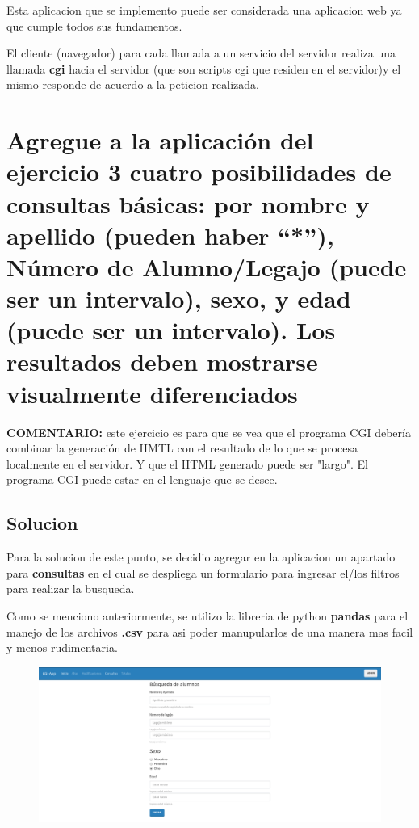 \documentclass[12pt]{extarticle}
\begin{document}
Esta aplicacion que se implemento puede ser considerada una aplicacion
web ya que cumple todos sus fundamentos.

El cliente (navegador) para cada llamada a un servicio del servidor
realiza una llamada \textbf{cgi} hacia el servidor (que son scripts cgi
que residen en el servidor)y el mismo responde de acuerdo a la peticion
realizada.

    \section{Agregue a la aplicación del ejercicio 3 cuatro posibilidades de
consultas básicas: por nombre y apellido (pueden haber ``*''), Número de
Alumno/Legajo (puede ser un intervalo), sexo, y edad (puede ser un
intervalo). Los resultados deben mostrarse visualmente
diferenciados}\label{agregue-a-la-aplicaciuxf3n-del-ejercicio-3-cuatro-posibilidades-de-consultas-buxe1sicas-por-nombre-y-apellido-pueden-haber-nuxfamero-de-alumnolegajo-puede-ser-un-intervalo-sexo-y-edad-puede-ser-un-intervalo.-los-resultados-deben-mostrarse-visualmente-diferenciados}

\textbf{COMENTARIO:} este ejercicio es para que se vea que el programa
CGI debería combinar la generación de HMTL con el resultado de lo que se
procesa localmente en el servidor. Y que el HTML generado puede ser
"largo". El programa CGI puede estar en el lenguaje que se desee.

    \subsection{Solucion}\label{solucion}

Para la solucion de este punto, se decidio agregar en la aplicacion un
apartado para \textbf{consultas} en el cual se despliega un formulario
para ingresar el/los filtros para realizar la busqueda.

Como se menciono anteriormente, se utilizo la libreria de python
\textbf{pandas} para el manejo de los archivos \textbf{.csv} para asi
poder manupularlos de una manera mas facil y menos rudimentaria.

\begin{figure}[h]
\centering
\includegraphics{images/consultas.png}
\caption{}
\end{figure}
\end{document}
